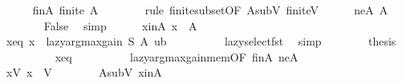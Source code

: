 \begin{isabellebody}
\ \ \ \ \isamarkupfalse%
\ finA{\isacharcolon}{\kern0pt}\ {\isachardoublequoteopen}finite\ {\isacharquery}{\kern0pt}A{\isachardoublequoteclose}\isanewline
\ \ \ \ \ \ \isamarkupfalse%
\ {\isacharparenleft}{\kern0pt}rule\ finite{\isacharunderscore}{\kern0pt}subset{\isacharbrackleft}{\kern0pt}OF\ A{\isacharunderscore}{\kern0pt}subV\ finite{\isacharunderscore}{\kern0pt}V{\isacharbrackright}{\kern0pt}{\isacharparenright}{\kern0pt}\isanewline
\isanewline
\ \ \ \ \isamarkupfalse%
\ neA{\isacharcolon}{\kern0pt}\ {\isachardoublequoteopen}{\isacharquery}{\kern0pt}A\ {\isasymnoteq}\ {\isacharbraceleft}{\kern0pt}{\isacharbraceright}{\kern0pt}{\isachardoublequoteclose}\isanewline
\ \ \ \ \ \ \isamarkupfalse%
\ False\ \isamarkupfalse%
\ simp\isanewline
\isanewline
\ \ \ \ \isamarkupfalse%
\ x{\isacharunderscore}{\kern0pt}inA{\isacharcolon}{\kern0pt}\ {\isachardoublequoteopen}{\isacharquery}{\kern0pt}x\ {\isasymin}\ {\isacharquery}{\kern0pt}A{\isachardoublequoteclose}\isanewline
\ \ \ \ \isamarkupfalse%
\ {\isacharminus}{\kern0pt}\isanewline
\ \ \ \ \ \ \isamarkupfalse%
\ x{\isacharunderscore}{\kern0pt}eq{\isacharcolon}{\kern0pt}\ {\isachardoublequoteopen}{\isacharquery}{\kern0pt}x\ {\isacharequal}{\kern0pt}\ lazy{\isacharunderscore}{\kern0pt}argmax{\isacharunderscore}{\kern0pt}gain\ {\isacharquery}{\kern0pt}S\ {\isacharquery}{\kern0pt}A\ {\isacharquery}{\kern0pt}ub{\isachardoublequoteclose}\isanewline
\ \ \ \ \ \ \ \ \isamarkupfalse%
\ lazy{\isacharunderscore}{\kern0pt}select{\isacharunderscore}{\kern0pt}fst\ \isamarkupfalse%
\ simp\isanewline
\ \ \ \ \ \ \isamarkupfalse%
\ {\isacharquery}{\kern0pt}thesis\isanewline
\ \ \ \ \ \ \ \ \isamarkupfalse%
\ x{\isacharunderscore}{\kern0pt}eq\isanewline
\ \ \ \ \ \ \ \ \isamarkupfalse%
\ lazy{\isacharunderscore}{\kern0pt}argmax{\isacharunderscore}{\kern0pt}gain{\isacharunderscore}{\kern0pt}mem{\isacharbrackleft}{\kern0pt}OF\ finA\ neA{\isacharbrackright}{\kern0pt}\ \isakeywordONE{{\isachardot}{\kern0pt}}\isamarkupfalse%
\isanewline
\ \ \ \ \isamarkupfalse%
\isanewline
\isanewline
\ \ \ \ \isamarkupfalse%
\ xV{\isacharcolon}{\kern0pt}\ {\isachardoublequoteopen}{\isacharquery}{\kern0pt}x\ {\isasymin}\ V{\isachardoublequoteclose}\isanewline
\ \ \ \ \ \ \isamarkupfalse%
\ A{\isacharunderscore}{\kern0pt}subV\ x{\isacharunderscore}{\kern0pt}inA\ \isamarkupfalse%

\end{isabellebody}
